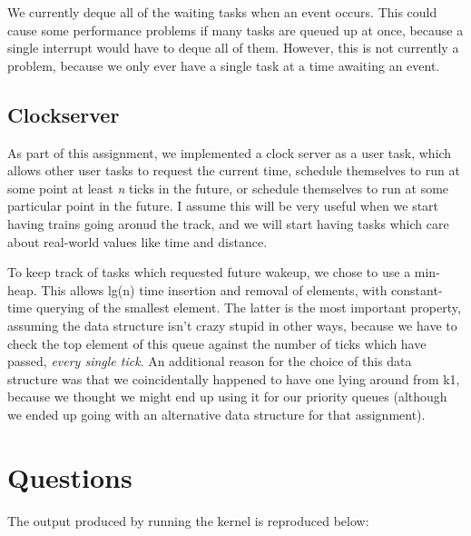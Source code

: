 \documentclass[titlepage]{article}
\begin{document}
We currently deque all of the waiting tasks when an event occurs. This could
cause some performance problems if many tasks are queued up at once, because
a single interrupt would have to deque all of them. However, this is not
currently a problem, because we only ever have a single task at a time
awaiting an event.

\subsection{Clockserver}
As part of this assignment, we implemented a clock server as a user task, which
allows other user tasks to request the current time, schedule themselves to run
at some point at least \emph{n} ticks in the future, or schedule themselves to
run at some particular point in the future. I assume this will be very useful
when we start having trains going aronud the track, and we will start having
tasks which care about real-world values like time and distance.

To keep track of tasks which requested future wakeup, we chose to use a
min-heap. This allows lg(n) time insertion and removal of elements, with
constant-time querying of the smallest element. The latter is the most
important property, assuming the data structure isn't crazy stupid in other
ways, because we have to check the top element of this queue against the
number of ticks which have passed, \emph{every single tick}. An additional
reason for the choice of this data structure was that we coincidentally
happened to have one lying around from k1, because we thought we might end up
using it for our priority queues (although we ended up going with an
alternative data structure for that assignment).


\section{Questions}

The output produced by running the kernel is reproduced below:
\end{document}

